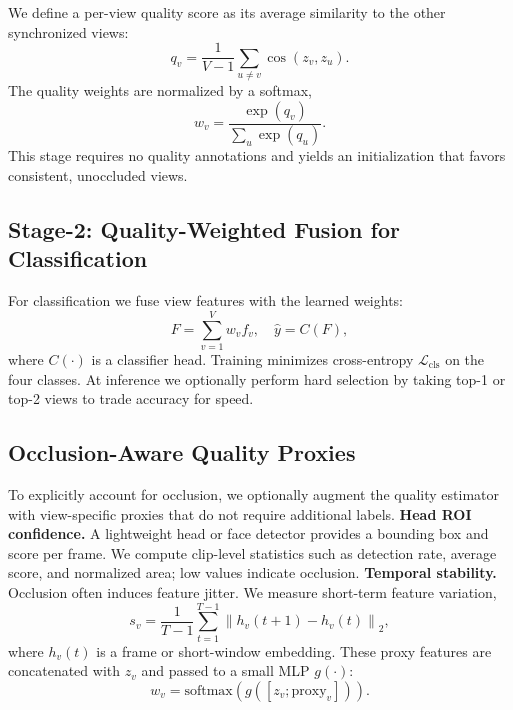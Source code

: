 \documentclass[runningheads]{llncs}
\begin{document}
We define a per-view quality score as its average similarity to the other synchronized views:
\begin{equation}
q_v = \frac{1}{V-1} \sum_{u \neq v} \cos(z_v, z_u).
\label{equ:qv}
\end{equation}
The quality weights are normalized by a softmax,
\begin{equation}
w_v = \frac{\exp(q_v)}{\sum_u \exp(q_u)}.
\label{equ:wv}
\end{equation}
This stage requires no quality annotations and yields an initialization that favors consistent, unoccluded views.

\subsection{Stage-2: Quality-Weighted Fusion for Classification}
For classification we fuse view features with the learned weights:
\begin{equation}
F = \sum_{v=1}^{V} w_v f_v, \quad \hat{y} = C(F),
\label{equ:fuse}
\end{equation}
where $C(\cdot)$ is a classifier head. Training minimizes cross-entropy $\mathcal{L}_{\text{cls}}$ on the four classes. At inference we optionally perform hard selection by taking top-1 or top-2 views to trade accuracy for speed.

\subsection{Occlusion-Aware Quality Proxies}
To explicitly account for occlusion, we optionally augment the quality estimator with view-specific proxies that do not require additional labels.
\textbf{Head ROI confidence.} A lightweight head or face detector provides a bounding box and score per frame. We compute clip-level statistics such as detection rate, average score, and normalized area; low values indicate occlusion.
\textbf{Temporal stability.} Occlusion often induces feature jitter. We measure short-term feature variation,
\begin{equation}
s_v = \frac{1}{T-1}\sum_{t=1}^{T-1}\left\|h_v(t+1) - h_v(t)\right\|_2,
\label{equ:stab}
\end{equation}
where $h_v(t)$ is a frame or short-window embedding. These proxy features are concatenated with $z_v$ and passed to a small MLP $g(\cdot)$:
\begin{equation}
w_v = \text{softmax}(g([z_v; \text{proxy}_v])).
\label{equ:proxy}
\end{equation}
\end{document}
